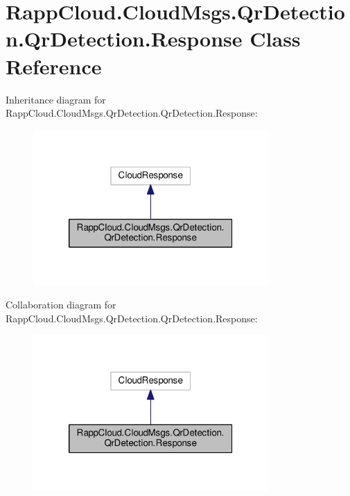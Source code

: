 \hypertarget{classRappCloud_1_1CloudMsgs_1_1QrDetection_1_1QrDetection_1_1Response}{\section{Rapp\-Cloud.\-Cloud\-Msgs.\-Qr\-Detection.\-Qr\-Detection.\-Response Class Reference}
\label{classRappCloud_1_1CloudMsgs_1_1QrDetection_1_1QrDetection_1_1Response}
}


Inheritance diagram for Rapp\-Cloud.\-Cloud\-Msgs.\-Qr\-Detection.\-Qr\-Detection.\-Response\-:
\nopagebreak
\begin{figure}[H]
\begin{center}
\leavevmode
\includegraphics[width=254pt]{classRappCloud_1_1CloudMsgs_1_1QrDetection_1_1QrDetection_1_1Response__inherit__graph}
\end{center}
\end{figure}


Collaboration diagram for Rapp\-Cloud.\-Cloud\-Msgs.\-Qr\-Detection.\-Qr\-Detection.\-Response\-:
\nopagebreak
\begin{figure}[H]
\begin{center}
\leavevmode
\includegraphics[width=254pt]{classRappCloud_1_1CloudMsgs_1_1QrDetection_1_1QrDetection_1_1Response__coll__graph}
\end{center}
\end{figure}
